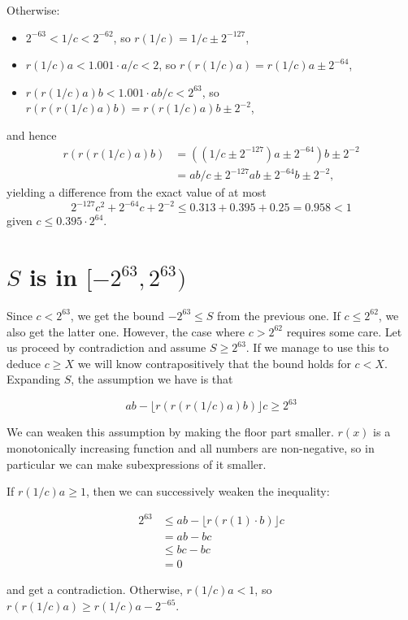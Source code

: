 \documentclass{article}
\begin{document}
Otherwise:
\begin{itemize}
    \item $2^{-63} < 1/c < 2^{-62}$, so $r(1/c) = 1/c \pm 2^{-127}$,
    \item $r(1/c)a < 1.001 \cdot a/c < 2$, so $r(r(1/c)a) = r(1/c)a \pm 2^{-64}$,
    \item $r(r(1/c)a)b < 1.001 \cdot ab/c < 2^{63}$, so $r(r(r(1/c)a)b) = r(r(1/c)a)b \pm 2^{-2}$,
\end{itemize}
and hence
\begin{align*}
    r(r(r(1/c)a)b) &= ((1/c \pm 2^{-127})a \pm 2^{-64}) b \pm 2^{-2} \\
                   &= ab/c \pm 2^{-127} ab \pm 2^{-64} b \pm 2^{-2},
\end{align*}
yielding a difference from the exact value of at most
\[ 2^{-127} c^2 + 2^{-64} c + 2^{-2} \le 0.313 + 0.395 + 0.25 = 0.958 < 1 \]
given $c \le 0.395 \cdot 2^{64}$.

\section{$S$ is in $[-2^{63}, 2^{63})$}

Since $c < 2^{63}$, we get the bound $-2^{63} \le S$ from the previous one. If $c \le 2^{62}$, we also get the latter one. However, the case where $c > 2^{62}$ requires some care. Let us proceed by contradiction and assume $S \ge 2^{63}$. If we manage to use this to deduce $c \ge X$ we will know contrapositively that the bound holds for $c < X$. Expanding $S$, the assumption we have is that

\[ ab - \lfloor r(r(r(1/c)a)b)\rfloor c \ge 2^{63} \]

We can weaken this assumption by making the floor part smaller. $r(x)$ is a monotonically increasing function and all numbers are non-negative, so in particular we can make subexpressions of it smaller.

If $r(1/c)a \ge 1$, then we can successively weaken the inequality:

\begin{align*}
2^{63}
  &\le ab - \lfloor r(r(1) \cdot b)\rfloor c \\
  &= ab - bc \\
  &\le bc - bc \\
  &= 0
\end{align*}

and get a contradiction. Otherwise, $r(1/c)a < 1$, so $r(r(1/c)a) \ge r(1/c)a - 2^{-65}$.
\end{document}
